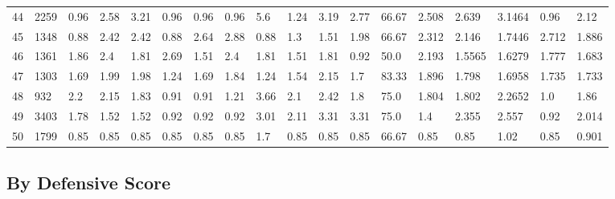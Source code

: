 \documentclass[landscape, 10pt]{report}
\begin{document}
\begin{longtable}{l || l || l | l | l | l | l | l | l | l | l | l | l || l | l | l | l | l}
44 & 2259 & 0.96 & 2.58 & 3.21 & 0.96 & 0.96 & 0.96 & 5.6 & 1.24 & 3.19 & 2.77 & 66.67 & 2.508 & 2.639 & 3.1464 & 0.96 & 2.12\\ 
\rowcolor{lightgray}45 & 1348 & 0.88 & 2.42 & 2.42 & 0.88 & 2.64 & 2.88 & 0.88 & 1.3 & 1.51 & 1.98 & 66.67 & 2.312 & 2.146 & 1.7446 & 2.712 & 1.886\\ 
46 & 1361 & 1.86 & 2.4 & 1.81 & 2.69 & 1.51 & 2.4 & 1.81 & 1.51 & 1.81 & 0.92 & 50.0 & 2.193 & 1.5565 & 1.6279 & 1.777 & 1.683\\ 
\rowcolor{lightgray}47 & 1303 & 1.69 & 1.99 & 1.98 & 1.24 & 1.69 & 1.84 & 1.24 & 1.54 & 2.15 & 1.7 & 83.33 & 1.896 & 1.798 & 1.6958 & 1.735 & 1.733\\ 
48 & 932 & 2.2 & 2.15 & 1.83 & 0.91 & 0.91 & 1.21 & 3.66 & 2.1 & 2.42 & 1.8 & 75.0 & 1.804 & 1.802 & 2.2652 & 1.0 & 1.86\\ 
\rowcolor{lightgray}49 & 3403 & 1.78 & 1.52 & 1.52 & 0.92 & 0.92 & 0.92 & 3.01 & 2.11 & 3.31 & 3.31 & 75.0 & 1.4 & 2.355 & 2.557 & 0.92 & 2.014\\ 
50 & 1799 & 0.85 & 0.85 & 0.85 & 0.85 & 0.85 & 0.85 & 1.7 & 0.85 & 0.85 & 0.85 & 66.67 & 0.85 & 0.85 & 1.02 & 0.85 & 0.901\\ 
\end{longtable} 
 
\pagebreak\subsection*{By Defensive Score} 
\end{document}
